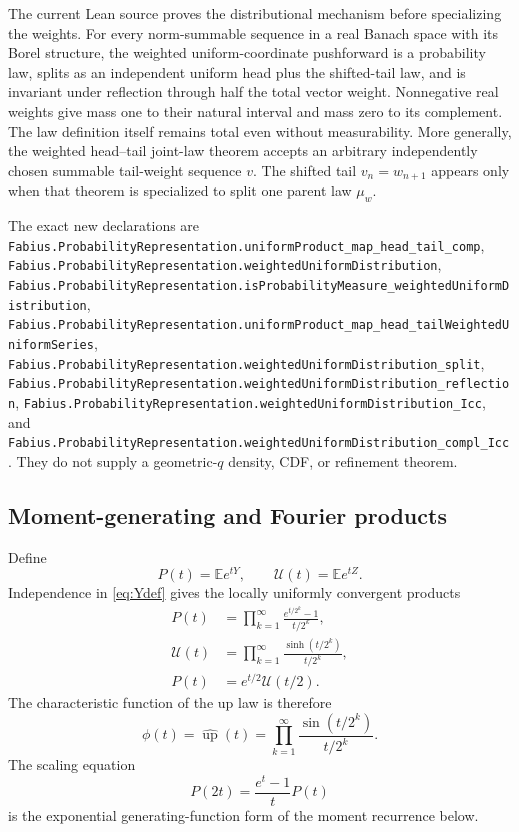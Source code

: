 \documentclass[11pt,oneside]{article}
\theoremstyle{definition}
\newcommand{\upf}{\operatorname{up}}
\newcommand{\E}{\mathbb E}
\begin{document}
\begin{statusbox}
The current Lean source proves the distributional mechanism before specializing the
weights.  For every norm-summable sequence in a real Banach space with its Borel
structure, the weighted uniform-coordinate pushforward is a probability law, splits as
an independent uniform head plus the shifted-tail law, and is invariant under reflection
through half the total vector weight.  Nonnegative real weights give mass one to their
natural interval and mass zero to its complement.  The law definition itself remains
total even without measurability.  More generally, the weighted head--tail joint-law
theorem accepts an arbitrary independently chosen summable tail-weight sequence \(v\).
The shifted tail \(v_n=w_{n+1}\) appears only when that theorem is specialized to split
one parent law \(\mu_w\).

The exact new declarations are
\nolinkurl{Fabius.ProbabilityRepresentation.uniformProduct_map_head_tail_comp},
\nolinkurl{Fabius.ProbabilityRepresentation.weightedUniformDistribution},
\nolinkurl{Fabius.ProbabilityRepresentation.isProbabilityMeasure_weightedUniformDistribution},
\nolinkurl{Fabius.ProbabilityRepresentation.uniformProduct_map_head_tailWeightedUniformSeries},
\nolinkurl{Fabius.ProbabilityRepresentation.weightedUniformDistribution_split},
\nolinkurl{Fabius.ProbabilityRepresentation.weightedUniformDistribution_reflection},
\nolinkurl{Fabius.ProbabilityRepresentation.weightedUniformDistribution_Icc}, and
\nolinkurl{Fabius.ProbabilityRepresentation.weightedUniformDistribution_compl_Icc}.
They do not supply a geometric-\(q\) density, CDF, or refinement theorem.
\end{statusbox}

\subsection{Moment-generating and Fourier products}

Define
\begin{equation}\label{eq:P-U-products}
 P(t)=\E e^{tY},\qquad \mathcal U(t)=\E e^{tZ}.
\end{equation}
Independence in \cref{eq:Ydef} gives the locally uniformly convergent products
\begin{align}
 P(t)&=\prod_{k=1}^{\infty}
 \frac{e^{t/2^k}-1}{t/2^k},\label{eq:P-product}\\
 \mathcal U(t)&=\prod_{k=1}^{\infty}
 \frac{\sinh(t/2^k)}{t/2^k},\label{eq:U-product}\\
 P(t)&=e^{t/2}\mathcal U(t/2).\label{eq:P-U-relation}
\end{align}
The characteristic function of the up law is therefore
\begin{equation}\label{eq:phi-product}
 \phi(t)=\widehat{\upf}(t)
 =\prod_{k=1}^{\infty}\frac{\sin(t/2^k)}{t/2^k}.
\end{equation}
The scaling equation
\begin{equation}\label{eq:P-pantograph}
 P(2t)=\frac{e^t-1}{t}P(t)
\end{equation}
is the exponential generating-function form of the moment recurrence below.
\end{document}
